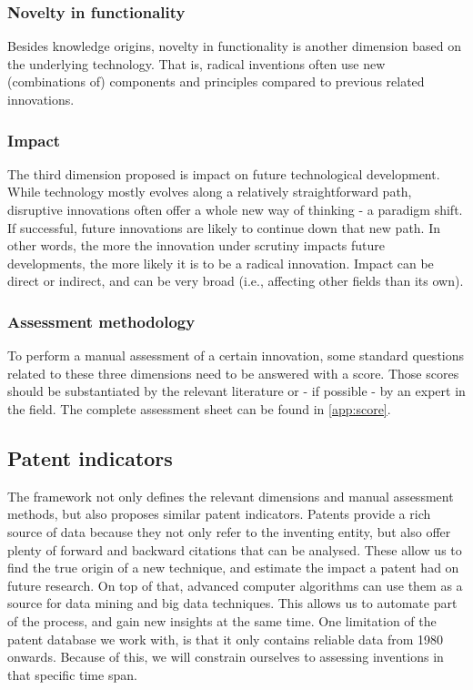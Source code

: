 \subsubsection{Novelty in functionality}
Besides knowledge origins, novelty in functionality is another dimension based
on the underlying technology. That is, radical inventions often use 
new (combinations of) components and principles compared to previous related
innovations.

\subsubsection{Impact}
The third dimension proposed is impact on future technological development.
While technology mostly evolves along a relatively straightforward path,
disruptive innovations often offer a whole new way of thinking - a paradigm
shift. If successful, future innovations are likely to continue down that new
path. In other words, the more the innovation under scrutiny impacts future
developments, the more likely it is to be a radical innovation. Impact can be
direct or indirect, and can be very broad (i.e., affecting other fields than
its own).

\subsubsection{Assessment methodology}
To perform a manual assessment of a certain innovation, some standard questions
related to these three dimensions need to be answered with a score. Those
scores should be substantiated by the relevant literature  or - if possible - by
an expert in the field. The complete assessment sheet can be found in
\autoref{app:score}.

\subsection{Patent indicators}
The framework not only defines the relevant dimensions and manual assessment
methods, but also proposes similar patent indicators. Patents provide a rich
source of data because they not only refer to the inventing entity, but also
offer plenty of forward and backward citations that can be analysed. These allow
us to find the true origin of a new technique, and estimate the impact a patent
had on future research. On top of that, advanced computer algorithms can use
them as a source for data mining and big data techniques. This allows us to
automate part of the process, and gain new insights at the same time. One
limitation of the patent database we work with, is that it only contains
reliable data from 1980 onwards. Because of this, we will constrain ourselves to
assessing inventions in that specific time span.

